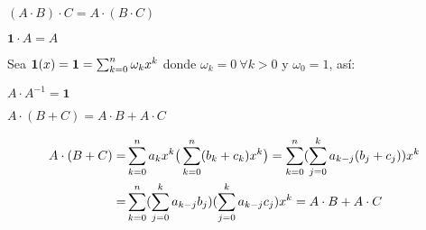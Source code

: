 \documentclass[letterpaper,12pt]{book}
\newenvironment{proof}[1][Dem]{\begin{trivlist} %
\item[\hskip \labelsep {\bfseries #1}]}{\end{trivlist}}
\newcommand{\qed}{\nobreak \ifvmode \relax \else %
      \ifdim\lastskip<1.5em \hskip-\lastskip
      \hskip1.5em plus0em minus0.5em \fi \nobreak
      \vrule height0.75em width0.5em depth0.25em\fi}
\begin{document}
\begin{proof}
\begin{enumerate}
 \item $ (A \cdot B) \cdot C = A \cdot (B \cdot C) $
 \begin{proof}
 
 \end{proof}
 
 \item $\textbf{1}\cdot A = A $
 \begin{proof}
 Sea $ \textbf{1}(x)  = \textbf{1} = \sum_{k=0}^n \omega_k x^k$ donde $\omega_k = 0 \ \forall k > 0$ y $\omega_0 = 1$, así:
 \end{proof}
 
 \item $A \cdot A^{-1} = \textbf{1} $
 \begin{proof}
 
 \end{proof}
 
 \item $ A \cdot (B+C) = A \cdot B + A \cdot C $
 \begin{proof}
  \begin{align*}
  A \cdot (B+C) =& \sum_{k=0}^n a_k x^k \big(\sum_{k=0}^n (b_k + c_k) x^k \big) = \sum_{k=0}^n (\sum_{j=0}^k a_{k-j}(b_j+c_j) ) x^k \\
  =& \sum_{k=0}^n (\sum_{j=0}^k a_{k-j}b_j ) (\sum_{j=0}^k a_{k-j}c_j ) x^k = A \cdot B + A \cdot C
  \end{align*}   
 \end{proof}
 
\end{enumerate}
\qed
\end{proof}

\end{document}
